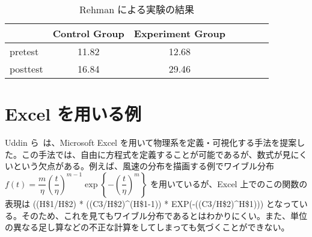 \begin{table}[htb]
\centering
\begin{tabular}{lcccccc}
\toprule
& Control Group & Experiment Group \\
\midrule
pretest & 11.82 & 12.68 \\
posttest & 16.84 & 29.46 \\
\bottomrule
\end{tabular}
\caption{Rehman による実験の結果} \label{rehman_result}
\end{table}


\section{Excel を用いる例}

Uddin ら~\cite{uddin_teaching_2017}は、Microsoft Excel を用いて物理系を定義・可視化する手法を提案した。この手法では、自由に方程式を定義することが可能であるが、数式が見にくいという欠点がある。例えば、風速の分布を描画する例でワイブル分布 $f(t) = \dfrac{m}{\eta}\left(\dfrac{t}{\eta}\right)^{m-1}\exp{\left\{-\left(\dfrac{t}{\eta}\right)^m\right\}}$ を用いているが、Excel 上でのこの関数の表現は ((H\$1/H\$2) * ((C3/H\$2)\^{}(H\$1-1)) * EXP(-((C3/H\$2)\^{}H\$1))) となっている。そのため、これを見てもワイブル分布であるとはわかりにくい。また、単位の異なる足し算などの不正な計算をしてしまっても気づくことができない。
